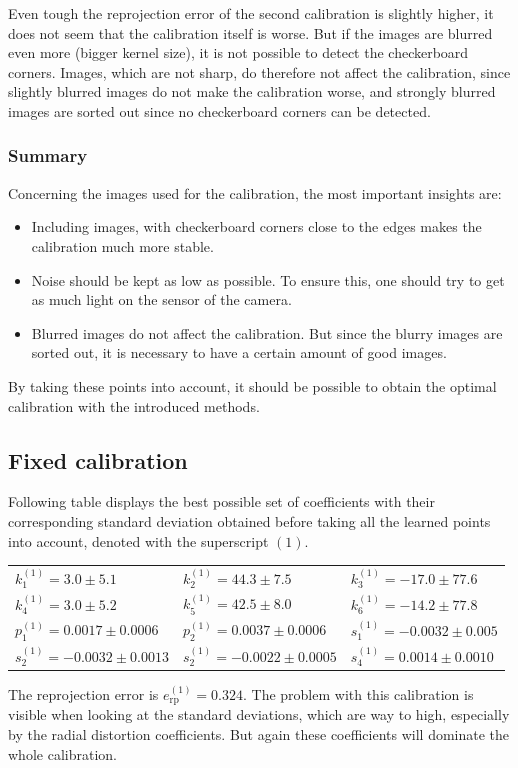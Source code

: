 Even tough the reprojection error of the second calibration is slightly higher, it does not seem that the calibration itself is worse.
But if the images are blurred even more (bigger kernel size), it is not possible to detect the checkerboard corners.
Images, which are not sharp, do therefore not affect the calibration, since slightly blurred images do not make the calibration worse, and strongly blurred images are sorted out since no checkerboard corners can be detected.

\clearpage
\subsubsection{Summary}
Concerning the images used for the calibration, the most important insights are:
\begin{itemize}
\item Including images, with checkerboard corners close to the edges makes the calibration much more stable.
\item Noise should be kept as low as possible. To ensure this, one should try to get as much light on the sensor of the camera.
\item Blurred images do not affect the calibration. But since the blurry images are sorted out, it is necessary to have a certain amount of good images.
\end{itemize}
By taking these points into account, it should be possible to obtain the optimal calibration with the introduced methods.

\subsection{Fixed calibration}
Following table displays the best possible set of coefficients with their corresponding standard deviation obtained before taking all the learned points into account, denoted with the superscript $(1)$.
\begin{center}
	\begin{tabular}{lll}
		$k_1^{(1)}=3.0\pm 5.1$&$k_2^{(1)}=44.3\pm 7.5$&$k_3^{(1)}=-17.0\pm 77.6$\\
		$k_4^{(1)}=3.0\pm 5.2$&$k_5^{(1)}=42.5\pm 8.0$&$k_6^{(1)}=-14.2\pm 77.8$\\
		$p_1^{(1)}=0.0017\pm 0.0006$&$p_2^{(1)}=0.0037\pm 0.0006$&$s_1^{(1)}=-0.0032\pm 0.005$\\
		$s_2^{(1)}=-0.0032\pm 0.0013$&$s_2^{(1)}=-0.0022\pm 0.0005$&$s_4^{(1)}=0.0014\pm 0.0010$
	\end{tabular} 
\end{center}
The reprojection error is $e_{\text{rp}}^{(1)}=0.324$.
The problem with this calibration is visible when looking at the standard deviations, which are way to high, especially by the radial distortion coefficients.
But again these coefficients will dominate the whole calibration.

